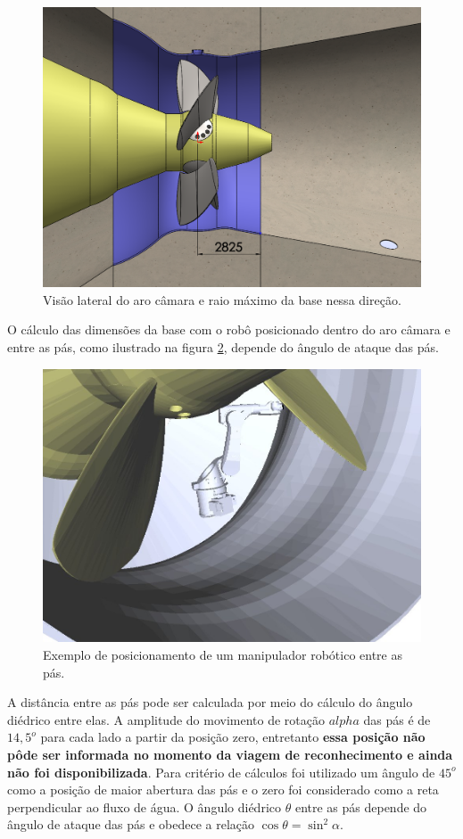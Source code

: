 \begin{figure}[h!]
\centering
	\includegraphics[width=\columnwidth]{sota/figs/base/turbine_side}
	\caption{Visão lateral do aro câmara e raio máximo da base nessa direção.}
	\label{fig::turbine_side}
\end{figure}

O cálculo das dimensões da base com o robô posicionado dentro do aro câmara e
entre as pás, como ilustrado na figura \ref{fig::robot_between}, depende do
ângulo de ataque das pás.

\begin{figure}[h!]
\centering
	\includegraphics[width=\columnwidth]{sota/figs/openrave/robot_between_openrave.jpg}
	\caption{Exemplo de posicionamento de um manipulador robótico entre as pás.}
	\label{fig::robot_between}
\end{figure}
A distância entre as pás pode ser calculada por meio do cálculo do ângulo diédrico entre elas. A amplitude do movimento de rotação $alpha$ 
das pás é de $14,5^o$ para cada lado a partir da posição zero, entretanto \textbf{essa posição não pôde ser
informada no momento da viagem de reconhecimento e ainda não foi
disponibilizada}. Para critério de cálculos foi utilizado um ângulo de
$45^o$ como a posição de maior abertura das pás e o zero foi considerado como
a reta perpendicular ao fluxo de água. O ângulo diédrico $\theta$ entre as pás
depende do ângulo de ataque das pás e obedece a relação $\cos{\theta} =
\sin^2{\alpha}.$

